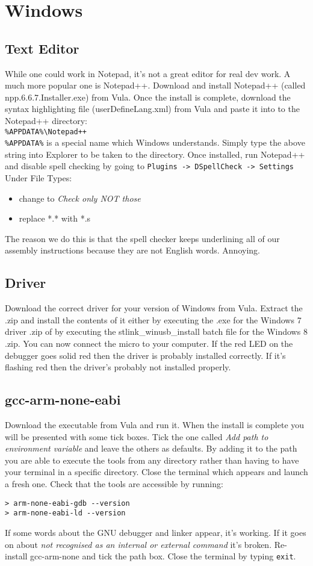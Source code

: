 \section{Windows}
\subsection{Text Editor}
While one could work in Notepad, it's not a great editor for real dev work. A much more popular one is Notepad++. Download and install Notepad++ (called npp.6.6.7.Installer.exe) from Vula. 
Once the install is complete, download the syntax highlighting file (userDefineLang.xml) from Vula and paste it into to the Notepad++ directory: \\
\verb;%APPDATA%\Notepad++;\\
\verb+%APPDATA%+ is a special name which Windows understands. Simply type the above string into Explorer to be taken to the directory. 
Once installed, run Notepad++ and disable spell checking by going to \verb+Plugins -> DSpellCheck -> Settings+
Under File Types:
\begin{itemize}
\item change to \textit{Check only NOT those}
\item replace   *.*   with   *.s
\end{itemize}
The reason we do this is that the spell checker keeps underlining all of our assembly instructions because they are not English words. Annoying.

\subsection{Driver}
Download the correct driver for your version of Windows from Vula. Extract the .zip and install the contents of it either by executing the .exe for the Windows 7 driver .zip of by executing the stlink\_winusb\_install batch file for the Windows 8 .zip.
You can now connect the micro to your computer. If the red LED on the debugger goes solid red then the driver is probably installed correctly. If it's flashing red then the driver's probably not installed properly. 

\subsection{gcc-arm-none-eabi}
Download the executable from Vula and run it. When the install is complete you will be presented with some tick boxes. Tick the one called \textit{Add path to environment variable} and leave the others as defaults. By adding it to the path you are able to execute the tools from any directory rather than having to have your terminal in a specific directory. 
Close the terminal which appears and launch a fresh one. Check that the tools are accessible by running:
\begin{lstlisting}[style=BashStyle]
> arm-none-eabi-gdb --version
> arm-none-eabi-ld --version
\end{lstlisting}
If some words about the GNU debugger and linker appear, it's working. 
If it goes on about \textit{not recognised as an internal or external command} it's broken. Re-install gcc-arm-none and tick the path box.
Close the terminal by typing \texttt{exit}.


